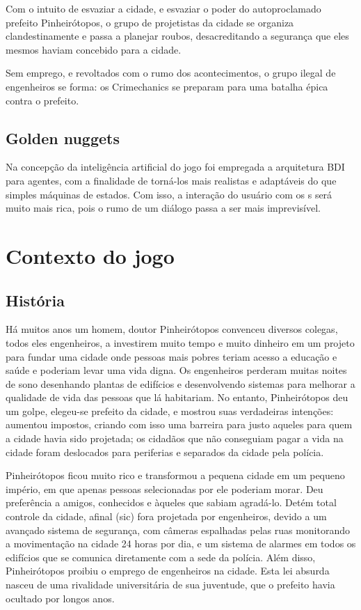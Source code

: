 Com o intuito de esvaziar a cidade, e esvaziar o poder do autoproclamado prefeito Pinheirótopos, o grupo de projetistas da cidade se organiza clandestinamente e passa a planejar roubos, desacreditando a segurança que eles mesmos haviam concebido para a cidade.

\newcommand{\nomeGrupo}{Crimechanics}

Sem emprego, e revoltados com o rumo dos acontecimentos, o grupo ilegal de engenheiros se forma: os \nomeGrupo{} se preparam para uma batalha épica contra o prefeito.

\subsection{Golden nuggets}
Na concepção da inteligência artificial do jogo foi empregada a arquitetura BDI para agentes, com a finalidade de torná-los mais realistas e adaptáveis do que simples máquinas de estados. Com isso, a interação do usuário com os \npc{}s será muito mais rica, pois o rumo de um diálogo passa a ser mais imprevisível.

\section{Contexto do jogo}
\subsection{História}

Há muitos anos um homem, doutor Pinheirótopos convenceu diversos colegas, todos eles engenheiros, a investirem muito tempo e muito dinheiro em um projeto para fundar uma cidade onde pessoas mais pobres teriam acesso a educação e saúde e poderiam levar uma vida digna. Os engenheiros perderam muitas noites de sono desenhando plantas de edifícios e desenvolvendo sistemas para melhorar a qualidade de vida das pessoas que lá habitariam.
No entanto, Pinheirótopos deu um golpe, elegeu-se prefeito da cidade, e mostrou suas verdadeiras intenções: aumentou impostos, criando com isso uma barreira para justo aqueles para quem a cidade havia sido projetada; os cidadãos que não conseguiam pagar a vida na cidade foram deslocados para periferias e separados da cidade pela polícia.

Pinheirótopos ficou muito rico e transformou a pequena cidade em um pequeno império, em que apenas pessoas selecionadas  por ele poderiam morar. Deu preferência a amigos, conhecidos e àqueles que sabiam agradá-lo. Detém total controle da cidade, afinal (sic) fora projetada por engenheiros, devido a um avançado sistema de segurança, com câmeras espalhadas pelas ruas monitorando a movimentação na cidade 24 horas por dia, e um sistema de alarmes em todos os edifícios que se comunica diretamente com a sede da polícia. Além disso, Pinheirótopos proibiu o emprego de engenheiros na cidade. Esta lei absurda nasceu de uma rivalidade universitária de sua juventude, que o prefeito havia ocultado por longos anos.


